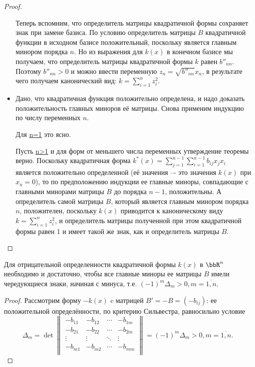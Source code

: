 \begin{proof}
\begin{itemize}[wide, labelwidth=!, labelindent=\parindent]
  Теперь вспомним, что определитель матрицы квадратичной формы сохраняет знак при замене базиса. По условию определитель матрицы $B$ квадратичной функции в исходном базисе положительный, поскольку является главным минором порядка $n$. Но из выражения для $k(x)$ в конечном базисе мы получаем, что определитель матрицы квадратичной формы $k$ равен $b''_{nn}$. Поэтому $b''_{nn}>0$ и можно ввести переменную $z_n=\sqrt{b''_{nn}}x_n$, в результате чего получаем канонический вид: $k=\sum\limits_{i=1}^nz_i^2$.
  
  \item[\fbox{необх.:}] Дано, что квадратичная функция положительно определена, и надо доказать положительность главных миноров её матрицы. Снова применим индукцию по числу переменных $n$. 
  
  Для \underline{n=1} это ясно.
  
  Пусть \underline{n>1} и для форм от меньшего числа переменных утверждение теоремы верно. Поскольку квадратичная форма $k^*(x)=\sum\limits_{j=1}^{n-1}\sum\limits_{i=1}^{n-1}b_{ij}x_jx_i$ является положительно определенной (её значения –- это значения $k(x)$ при $x_n=0$), то по предположению индукции ее главные миноры, совпадающие с главными минорами матрицы $B$ до порядка ${n-1}$, положительны. А определитель самой матрицы $B$, который является главным минором порядка $n$, положителен, поскольку $k(x)$ приводится к каноническому виду $k=\sum\limits_{i=1}^nz_i^2$, и определитель матрицы полученной при этом квадратичной формы равен 1 и имеет такой же знак, как и определитель матрицы $B$.
  \end{itemize}
  \end{proof}
  
  \begin{cons} 
  Для отрицательной определенности квадратичной формы  $k(x)$ в $\bbR^n$ необходимо и достаточно, чтобы все главные миноры ее матрицы $B$ имели чередующиеся знаки, начиная с минуса, т.е. $(-1)^m\Delta_m>0,m=\overline{1,n}$.
  \end{cons}
  \begin{proof}
  Рассмотрим форму $-k(x)$ c матрицей $B'=-B=(-b_{ij})$: ее положительной определённости, по критерию Сильвестра, равносильно условие
  \begin{equation}
  \Delta_m=\det \begin{Vmatrix}
  -b_{11} & -b_{12} & \cdots & -b_{1m} \\
  -b_{21} & -b_{22} & \cdots & -b_{2m} \\
  \vdots  & \vdots  & \ddots & \vdots \\
  -b_{m1} & -b_{m2} & \cdots & -b_{mm} \\
  \end{Vmatrix}=(-1)^m\Delta_m>0, m=\overline{1,n}.
  \end{equation}
  \end{proof}